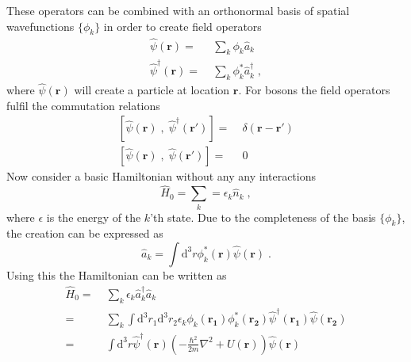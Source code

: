 These operators can be combined with an orthonormal basis of spatial wavefunctions $\{ \phi_k \}$ in order to create field operators
\begin{align}
	\hat{\psi}(\boldsymbol{r}) =& \; \sum_{k} \phi_k \hat{a}_{k} \\
	\hat{\psi}^{\dag}(\boldsymbol{r}) =& \; \sum_{k} \phi_{k}^{*} \hat{a}_{k}^{\dag} \; ,
\end{align}
where $\hat{\psi}(\boldsymbol{r})$ will create a particle at location $\boldsymbol{r}$. For bosons the field operators fulfil the commutation relations \cite{bruus}
\begin{align}
	\left[ \hat{\psi}(\boldsymbol{r}) \; , \; \hat{\psi}^{\dag}(\boldsymbol{r'}) \right] =& \; \delta(\boldsymbol{r} - \boldsymbol{r}') \\
	\left[ \hat{\psi}(\boldsymbol{r}) \; , \; \hat{\psi}(\boldsymbol{r'}) \right] =& \; 0
\end{align}
Now consider a basic Hamiltonian without any any interactions
\begin{equation}
	\hat{H}_0 = \sum_{k} = \epsilon_k \hat{n}_k \; ,
\end{equation}
where $\epsilon$ is the energy of the $k$'th state. Due to the completeness of the basis $\{ \phi_k \}$, the creation can be expressed as
\begin{equation}
	\hat{a}_k = \int \mathrm{d^3} r \phi_{k}^*(\boldsymbol{r}) \hat{\psi}(\boldsymbol{r}) \; .
\end{equation}
Using this the Hamiltonian can be written as
\begin{align}
	\hat{H}_0 =& \; \sum_{k} \epsilon_k \hat{a}_{k}^{\dag} \hat{a}_{k} \\
		=& \;  \sum_{k} \int \mathrm{d^3}r_1 \mathrm{d^3}r_2 \epsilon_k \phi_k (\boldsymbol{r_1}) \phi_{k}^* (\boldsymbol{r_2}) \hat{\psi}^{\dag} (\boldsymbol{r_1}) \hat{\psi} (\boldsymbol{r_2}) \\
		=& \; \int \mathrm{d^3}r \hat{\psi}^{\dag}(\boldsymbol{r}) \left( - \frac{\hbar^2}{2 m} \nabla^2 + U(\boldsymbol{r})\right) \hat{\psi}(\boldsymbol{r})
		\label{hamil2nd}
\end{align}

